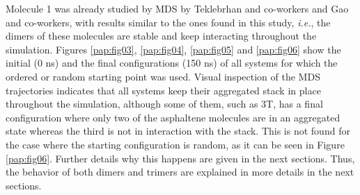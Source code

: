 Molecule 1 was already studied by MDS by Teklebrhan and co-workers\cite{teklebrhan2012probing,teklebrhan2014initial} and Gao and co-workers,\cite{gao2014molecular} with results similar to the ones found in this study, \textit{i.e.}, the dimers of these molecules are stable and keep interacting throughout the simulation. 
Figures \ref{pap:fig03}, \ref{pap:fig04}, \ref{pap:fig05} and \ref{pap:fig06} show the initial (0 ns) and the final configurations (150 ns) of all systems for which the ordered or random starting point was used. Visual inspection of the MDS trajectories indicates that all systems keep their aggregated stack in place throughout the simulation, although some of them, such as 3T, has a final configuration where only two of the asphaltene molecules are in an aggregated state whereas the third is not in interaction with the stack. This is not found for the case where the starting configuration is random, as it can be seen in Figure \ref{pap:fig06}. Further details why this happens are given in the next sections. Thus, the behavior of both dimers and trimers are explained in more details in the next sections. 

